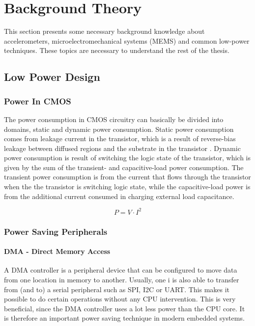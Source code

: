 \chapter{Background Theory}

This section presents some necessary background knowledge about accelerometers, microelectromechanical systems (MEMS) and common low-power techniques. These topics are necessary to understand the rest of the thesis. 

\section{Low Power Design}

\subsection{Power In CMOS}

The power consumption in CMOS circuitry can basically be divided into domains, static and dynamic power consumption. Static power consumption comes from leakage current in the transistor, which is a result of reverse-bias leakage between diffused regions and the
substrate in the transistor \cite{static_dynamic_power}. Dynamic power consumption is result of switching the logic state of the transistor, which is given by the sum of the transient- and capacitive-load power consumption. The transient power consumption is from the current that flows through the transistor when the the transistor is switching logic state, while the capacitive-load power is from the additional current consumed in charging external load capacitance. 

\begin{equation}
P = V \cdot I^2
\end{equation}

\subsection{Power Saving Peripherals}

\subsubsection{DMA - Direct Memory Access}

A DMA controller is a peripheral device that can be configured to move data from one location in memory to another. Usually, one i is also able to transfer from (and to) a serial peripheral such as SPI, I2C or UART. This makes it possible to do certain operations without any CPU intervention. This is very beneficial, since the DMA controller uses a lot less power than the CPU core. It is therefore an important power saving technique in modern embedded systems.  

